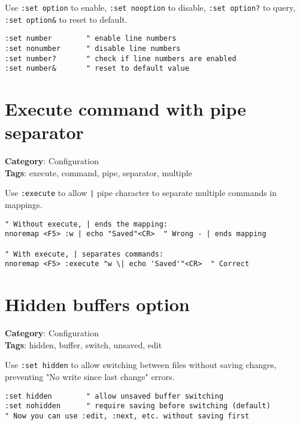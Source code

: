 {{{{Use {\footnotesize \Verb§:set option§} to enable, {\footnotesize \Verb§:set nooption§} to disable, {\footnotesize \Verb§:set option?§} to query, {\footnotesize \Verb§:set option&§} to reset to default.

\begin{Exa*}{}
\begin{Verbatim}[fontsize=\footnotesize, breaklines, breakanywhere]
:set number        " enable line numbers
:set nonumber      " disable line numbers
:set number?       " check if line numbers are enabled
:set number&       " reset to default value
\end{Verbatim}
\end{Exa*}

\section{Execute command with pipe separator}

\textbf{Category}: Configuration\\ \textbf{Tags}: execute, command, pipe, separator, multiple
\vspace{0.5cm}

Use {\footnotesize \Verb§:execute§} to allow {\footnotesize \Verb§|§} pipe character to separate multiple commands in mappings.

\begin{Exa*}{}
\begin{Verbatim}[fontsize=\footnotesize, breaklines, breakanywhere]
" Without execute, | ends the mapping:
nnoremap <F5> :w | echo "Saved"<CR>  " Wrong - | ends mapping

" With execute, | separates commands:
nnoremap <F5> :execute "w \| echo 'Saved'"<CR>  " Correct
\end{Verbatim}
\end{Exa*}

\section{Hidden buffers option}

\textbf{Category}: Configuration\\ \textbf{Tags}: hidden, buffer, switch, unsaved, edit
\vspace{0.5cm}

Use {\footnotesize \Verb§:set hidden§} to allow switching between files without saving changes, preventing "No write since last change" errors.

\begin{Exa*}{}
\begin{Verbatim}[fontsize=\footnotesize, breaklines, breakanywhere]
:set hidden        " allow unsaved buffer switching
:set nohidden      " require saving before switching (default)
" Now you can use :edit, :next, etc. without saving first
\end{Verbatim}
\end{Exa*}

}}}}
